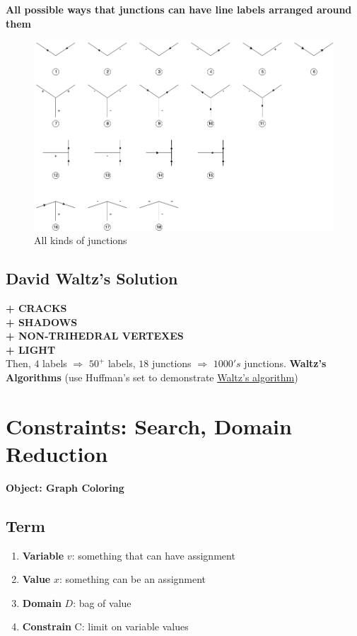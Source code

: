 \documentclass[12pt]{book}
\begin{document}
\indent \indent \textbf{All possible ways that junctions can have line labels arranged around them}
\begin{figure}[ht]
	\centering
	\includegraphics[scale=0.49]{Figure/Figure7_13.png}
	\caption{All kinds of junctions}
\end{figure}
\subsection{David Waltz's Solution}
\textbf{+ CRACKS}\\
\indent \textbf{+ SHADOWS}\\
\indent \textbf{+ NON-TRIHEDRAL VERTEXES}\\
\indent \textbf{+ LIGHT}\\
\indent Then, $4$ labels $\Longrightarrow$ $50^+$ labels, $18$ junctions $\Longrightarrow$ $1000's$ junctions.\newline \newline
\textbf{Waltz's Algorithms} (use Huffman's set to demonstrate \href{https://www.youtube.com/watch?v=l-tzjenXrvI#t=38m16s}{Waltz's algorithm})
\newpage
\section{Constraints: Search, Domain Reduction}
\textbf{Object: Graph Coloring}
\subsection{Term}
\begin{enumerate}
	\item \textbf{Variable} $v$: something that can have assignment
	\item \textbf{Value} $x$: something can be an assignment
	\item \textbf{Domain} $D$: bag of value
	\item \textbf{Constrain} C: limit on variable values
\end{enumerate}
\end{document}
